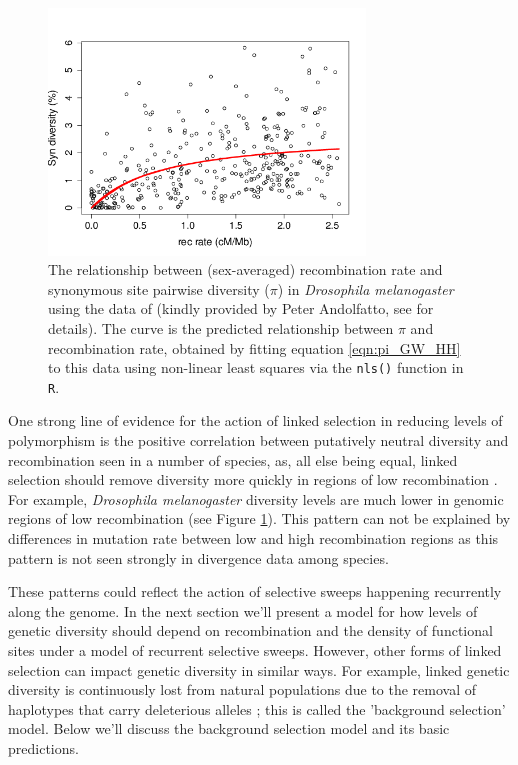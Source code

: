 \begin{figure}
\begin{center}
\includegraphics[width=0.75\textwidth]{figures/Genomewide_HH.png}
\end{center}
\caption{The relationship between (sex-averaged) recombination rate and synonymous
  site pairwise diversity ($\pi$) in {\it Drosophila melanogaster}
  using the data of \citep{Shapiro:07} (kindly provided by Peter
  Andolfatto, see \citet{sella2009pervasive} for details). The curve is the
  predicted relationship between $\pi$ and recombination rate, obtained
  by fitting equation \eqref{eqn:pi_GW_HH} to this data 
 using non-linear least squares via the {\tt nls()} function in {\tt R}.} \label{fig:GW_hitchhiking_reduction}
\end{figure}

One strong line of evidence for the action of linked selection in reducing levels of
polymorphism is the positive correlation between putatively
neutral diversity and recombination seen in a number of species, as, all
else being equal, linked selection should remove diversity more quickly in regions of low recombination 
\citep{Aguade:89,Begun:92,Wiehe:93,Cutter:10,Hellmann:08,Cai:09,
  cutter2013}. For example, {\it Drosophila melanogaster} diversity
levels are much lower in genomic regions of low recombination (see
Figure \ref{fig:GW_hitchhiking_reduction}). This pattern can not be
explained by differences in mutation rate between low and high
recombination regions as this pattern is not seen strongly in
divergence data among species.

These patterns could reflect the action of selective sweeps happening
recurrently along the genome. In the next section we'll present a model for how levels of
genetic diversity should depend on recombination and the density of
functional sites under a model of recurrent selective sweeps.
However, other forms of linked selection can impact genetic
diversity in similar ways. For example, linked genetic diversity is
continuously lost from natural populations due to the removal of
haplotypes that carry deleterious alleles
\citep{Charlesworth:95,Hudson:95}; this is called the 'background selection'
model. Below we'll discuss the background selection model and its
basic predictions.

